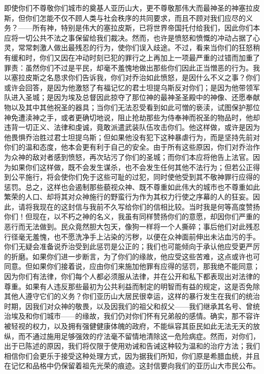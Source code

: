 即使你们不尊敬你们城市的奠基人亚历山大，更不尊敬那伟大而最神圣的神塞拉皮斯，但你们怎能不仅不顾人类与社会秩序的共同要求，而且不顾对我们应尽的义务？——所有神，特别是伟大的塞拉皮斯，已将世界帝国托付给我们，因此你们本应将一切公共不法之事保留给我们裁决。然而，也许是愤怒和愤慨的冲动占据了心灵，常常刺激人做出最残忍的行为，使你们误入歧途。不过，看来当你们的狂怒稍有缓和时，你们又因在冲动时刻已犯的罪行之上再加上一项最严重的过错而加重了罪责：虽然你们不过是平民，却毫不羞愧地做出那些你们因此正当憎恶的行为。我以塞拉皮斯之名恳求你们告诉我，你们对乔治如此愤怒，是因什么不义之事？你们或许会回答，是因为他激怒了有福记忆的君士坦提乌斯反对你们；是因为他带领军队进入圣城；是因为埃及总督因此掠夺了那位神的最神圣圣殿中的神像、还愿奉献物以及其中其他祝圣的器具；当你们无法忍受看到如此可憎的亵渎，试图保护那位神免遭渎神之手，或者更确切地说，阻止抢劫那些为侍奉神而祝圣的物品时，他却违背一切正义、法律和虔诚，竟敢派遣武装队伍攻击你们。他这样做，或许是因为他畏惧乔治胜过君士坦提乌斯；但如果他没有犯下这种暴虐行为，而是坚持先前对你们的温和态度，他本会更有利于自己的安全。由于所有这些原因，你们对乔治作为众神的敌对者感到愤怒，再次玷污了你们的圣城；而你们本应将他告上法官。因为如果你们这样做，既不会发生谋杀，也不会发生任何其他不法行为；但若公正得到公平施行，将会使你们免于这些可耻的过犯，同时使他受到其不敬神罪行应得的惩罚。总之，这样也会遏制那些藐视众神、既不尊重如此伟大的城市也不尊重如此繁荣的人口、却将其对众神施行的野蛮行为作为其权力行使之序幕的人的狂妄。因此，请将我现在的这封信与我前不久写给你们的信相比较。当时我是何等高度赞扬你们！但现在，以不朽之神的名义，我虽有同样赞扬你们的意愿，却因你们严重的恶行而无法做到。民众竟然胆大包天，像狗一样将一个人撕碎；事后他们对此残忍行径毫无羞愧，也不愿洗净手上沾染的污秽，以便在众神面前伸出未沾血污的手。你们无疑会准备说乔治受到此惩罚是公正的；我们也可能倾向于承认他应受更严厉的折磨。如果你们进一步断言，为了你们的缘故，他应受这些苦难，这点或许也可同意。但如果你们接着说，应由你们来施加他罪有应得的惩罚，那我绝不能同意；因为你们有法律，你们每个人都必须服从法律，并在公开和私下都表现出对法律的尊重。如果有人违反那些最初为公共利益而制定的明智而有益的规定，这是否免除其他人遵守它们的义务？你们亚历山大居民很幸运，这样的暴行发生在我们的统治时期，因我们对众神的敬畏，以及因我们的祖父和叔父——我们继承其名号、曾统治埃及和你们城市——的缘故，我们仍对你们怀有兄弟般的感情。确实，那不容许被轻视的权力，以及拥有强健健康体魄的政府，不能纵容其臣民如此无法无天的放纵，而不通过施用足够强效的疗法毫不留情地清除这一危险病症。然而，对你们，出于已陈述的原因，我们将仅限于使用劝诫和告诫这种较为温和的治疗方法；我们相信你们会更乐于接受这种处理方式，因为据我们所知，你们原是希腊血统，并且在记忆和品格中仍保留着祖先光荣的痕迹。这封信要向我们的亚历山大市民公布。\par

